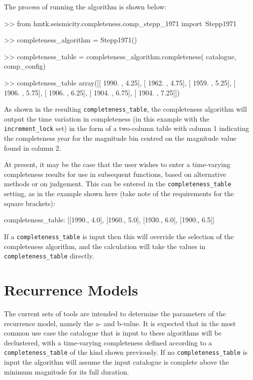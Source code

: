 The process of running the algorithm is shown below:

\begin{python}[frame=single]
>> from hmtk.seismicity.completeness.comp_stepp_1971 import\
    Stepp1971

>> completeness_algorithm = Stepp1971()

>> completeness_table = completeness_algorithm.completeness(
    catalogue,
    comp_config)

>> completeness_table 
array([[ 1990.  ,     4.25],
       [ 1962.  ,     4.75],
       [ 1959.  ,     5.25],
       [ 1906.  ,     5.75],
       [ 1906.  ,     6.25],
       [ 1904.  ,     6.75],
       [ 1904.  ,     7.25]])
\end{python}

As shown in the resulting \verb=completeness_table=, the completeness algorithm will output the time variation in completeness (in this example with the \verb=increment_lock= set) in the form of a two-column table with column 1 indicating the completeness year for the magnitude bin centred on the magnitude value found in column 2.

At present, it may be the case that the user wishes to enter a time-varying completeness results for use in subsequent functions, based on alternative methods or on judgement. This can be entered in the \verb=completeness_table= setting, as in the example shown here (take note of the requirements for the square brackets):

\begin{python}[frame=single]
completeness_table: [[1990., 4.0],
                     [1960., 5.0],
                     [1930., 6.0],
                     [1900., 6.5]]
\end{python}

If a \verb=completeness_table= is input then this will override the selection of the completeness algorithm, and the calculation will take the values in \verb=completeness_table= directly. 


\section{Recurrence Models}

The current sets of tools are intended to determine the parameters of the \cite{GutenbergRichter1944} recurrence model, namely the a- and b-value. It is expected that in the most common use case the catalogue that is input to these algorithms will be declustered, with a time-varying completeness defined according to a \verb=completeness_table= of the kind shown previously. If no \verb=completeness_table= is input the algorithm will assume the input catalogue is complete above the minimum magnitude for its full duration.

